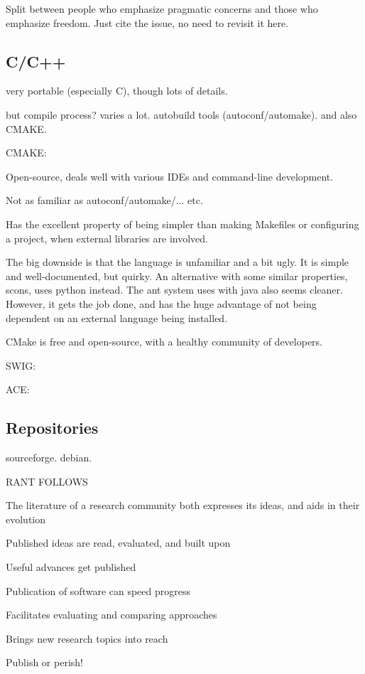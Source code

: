 Split between people who emphasize pragmatic concerns and those
who emphasize freedom.  Just cite the issue, no need to revisit
it here.




\subsection{C/C++}

very portable (especially C), though lots of details.

but compile process?  varies a lot. autobuild tools
(autoconf/automake).  and also CMAKE.

CMAKE:

Open-source, deals well with various IDEs and command-line development.

Not as familiar as autoconf/automake/... etc.

Has the excellent property of being simpler than making Makefiles
or configuring a project, when external libraries are involved.

The big downside is that the language is unfamiliar and a bit ugly.
It is simple and well-documented, but quirky.  An alternative with
some similar properties, scons, uses python instead.  The ant system
uses with java also seems cleaner.  However, it gets the job
done, and has the huge advantage of not being dependent on an
external language being installed.

CMake is free and open-source, with a healthy community of 
developers.


SWIG:

ACE:


\subsection{Repositories}

sourceforge.  debian.

RANT FOLLOWS

The literature of a research community both expresses its ideas, and
aids in their evolution

Published ideas are read, evaluated, and built upon

Useful advances get published

Publication of software can speed progress

Facilitates evaluating and comparing approaches

Brings new research topics into reach

Publish or perish!

